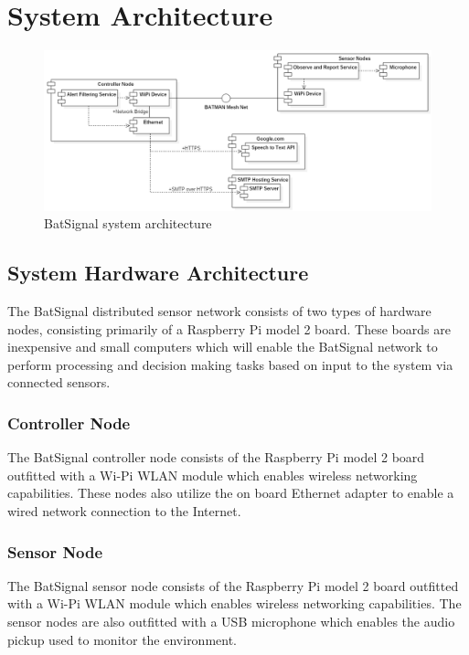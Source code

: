 \documentclass[11pt,a4paper]{article}
\begin{document}
\section{System Architecture}
\begin{figure}[h!]
	\centering
		\includegraphics[width=\textwidth, keepaspectratio=true]{Graphics/SystemArchitecture.png}
	\caption{BatSignal system architecture}
\end{figure}

\subsection{System Hardware Architecture}
The BatSignal distributed sensor network consists of two types of hardware nodes, consisting primarily of a Raspberry Pi model 2 board. These boards are inexpensive and small computers which will enable the BatSignal network to perform processing and decision making tasks based on input to the system via connected sensors. 

\subsubsection{Controller Node}
The BatSignal controller node consists of the Raspberry Pi model 2 board outfitted with a Wi-Pi WLAN module which enables wireless networking capabilities. These nodes also utilize the on board Ethernet adapter to enable a wired network connection to the Internet.

\subsubsection{Sensor Node}
The BatSignal sensor node consists of the Raspberry Pi model 2 board outfitted with a Wi-Pi WLAN module which enables wireless networking capabilities. The sensor nodes are also outfitted with a USB microphone which enables the audio pickup used to monitor the environment.
\end{document}
